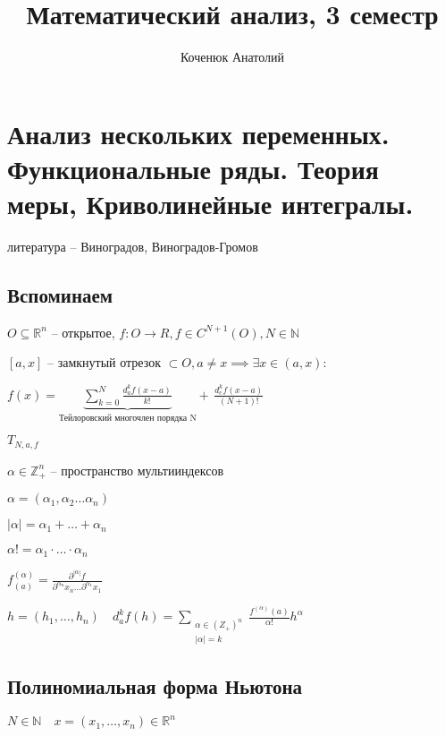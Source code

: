 \documentclass{book}
\author{Коченюк Анатолий}
\title{Математический анализ, 3 семестр}
\newcommand\N{\ensuremath{\mathbb{N}}}
\newcommand\R{\ensuremath{\mathbb{R}}}
\newcommand\Z{\ensuremath{\mathbb{Z}}}
\theoremstyle{definition}
\begin{document}
    \maketitle
    \chapter{Анализ нескольких переменных. Функциональные ряды. Теория меры, Криволинейные интегралы.}
    литература -- Виноградов, Виноградов-Громов
    \section{Вспоминаем}

    $O\subseteq \R^n$ -- открытое, $f:O \to R, f \in C^{N+1}(O), N\in \N $

    $[a,x]$ -- замкнутый отрезок  $\subset O, a\neq x \implies \exists x\in (a,x):$

    $f(x) = \underbrace{\sum_{k=0}^{N} \frac{d^k_af(x-a)}{k!}}_{\text{Тейлоровский многочлен порядка N}} +\, \frac{d^k_c f(x-a)}{(N+1)!}$

    $T_{N, a, f}$

     \begin{definition}
        $\alpha\in \Z _+^n$ -- пространство мультииндексов

        $\alpha = \left( \alpha_1, \alpha_2 \ldots \alpha_n \right) $ 

        $\left| \alpha \right| = \alpha_1 + \ldots + \alpha_n$

        $\alpha! = \alpha_1 \cdot  \ldots \cdot  \alpha_n$

        $f^{(\alpha)}_{(a)} = \frac{\partial^{|\alpha|}f}{\partial^{\alpha_n}x_n \ldots \partial^{\alpha_1}x_1}$
    \end{definition}

    $h = \left( h_1, \ldots, h_n \right) \quad d_a^k f(h) = \sum_{\substack{\alpha \in \left( Z_+ \right) ^n\\ |\alpha|=k}} \frac{f^{(\alpha)}(a)}{\alpha!}h^{\alpha}$

    \section{Полиномиальная форма Ньютона}

    $N\in \N \quad x = \left( x_1, \ldots, x_n \right) \in \R^n$ 
\end{document}
